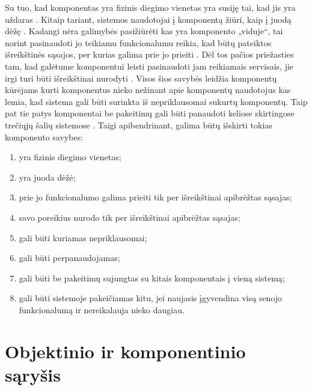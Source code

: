 Su tuo, kad komponentas yra fizinis diegimo vienetas yra susiję
tai, kad jis yra uždaras
\cite[36]{cs-beyond-object-oriented-programming}. Kitaip tariant,
sistemos naudotojai į komponentą žiūri, kaip į juodą
dėžę \cite[2]{Gill:2003:CMF:966221.966237}.
Kadangi nėra galimybės pasižiūrėti kas yra komponento „viduje“,
tai norint pasinaudoti jo teikiamu funkcionalumu reikia, kad būtų
pateiktos išreikštinės sąsajos, per kurias galima prie jo
prieiti
\cites[387]{objects-components-and-frameworks-with-uml}%
[36]{cs-beyond-object-oriented-programming}. Dėl tos
pačios priežasties tam, kad galėtume komponentui leisti pasinaudoti
jam reikiamais servisais, jie irgi turi būti išreikštinai nurodyti
\cites[387]{objects-components-and-frameworks-with-uml}%
[36]{cs-beyond-object-oriented-programming}. Visos šios
savybės leidžia komponentų kūrėjams kurti komponentus nieko
nežinant apie komponentų naudotojus
\cites[2]{Gill:2003:CMF:966221.966237}%
[139]{meyer1999components}
kas lemia, kad sistema gali būti surinkta iš nepriklausomai sukurtų
komponentų. Taip pat tie patys komponentai be pakeitimų gali būti
panaudoti keliose skirtingose trečiųjų šalių sistemose
\cites[388]{objects-components-and-frameworks-with-uml}%
[36]{cs-beyond-object-oriented-programming}. Taigi
apibendrinant, galima būtų išskirti tokias komponento savybes:
\begin{enumerate}
  \item \label{com:exe:deployment} yra fizinis diegimo vienetas;
  \item \label{com:exe:blackbox} yra juoda dėžė;
  \item \label{com:exe:interfaceprovider} prie jo funkcionalumo galima
    prieiti tik per išreikštinai apibrėžtas sąsajas;
  \item \label{com:exe:interfaceuser} savo poreikius nurodo tik per
    išreikštinai apibrėžtas sąsajas;
  \item \label{com:exe:independent} gali būti kuriamas nepriklausomai;
  \item \label{com:exe:reusable} gali būti perpanaudojamas;
  \item \label{com:exe:composed} gali būti be pakeitimų sujungtas su
    kitais komponentais į vieną sistemą;
  \item \label{com:exe:interchangable} gali būti sistemoje
    pakeičiamas kitu, jei naujasis įgyvendina visą senojo
    funkcionalumą ir nereikalauja nieko daugiau.
\end{enumerate}

\section{Objektinio ir komponentinio sąryšis}

